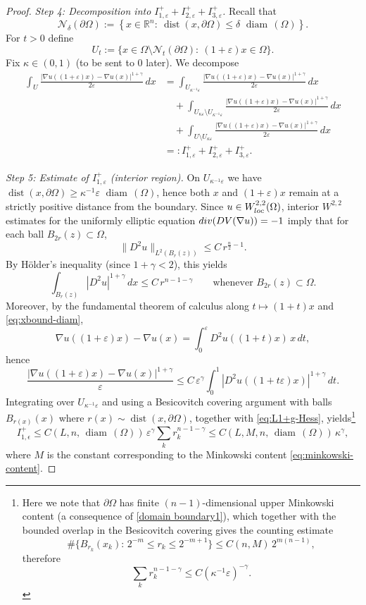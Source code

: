 \documentclass[10pt,a4paper]{amsart}
\def\diam{{\mathop\mathrm{\,diam\,}}}
\def\dist{{\mathop\mathrm{dist}}}
\def\ez{\epsilon}
\begin{document}
\begin{proof}
\medskip
\noindent\textit{Step 4: Decomposition into $I_{1,\varepsilon}^++I_{2,\varepsilon}^++I_{3,\varepsilon}^+$.}
Recall that
\[
\mathcal N_{\delta}(\partial \Omega):=\left\{ x\in \mathbb R^n:\ \dist(x,\partial \Omega)\le \delta\,\diam(\Omega) \right\}.
\]
For $t>0$ define
\[
U_t:=\Big\{x\in \Omega\setminus \mathcal N_{t}(\partial\Omega):\ (1+\varepsilon)x\in\Omega\Big\}.
\]
Fix $\kappa\in(0,1)$ (to be sent to $0$ later). We decompose
\begin{align*}
\int_U \frac{|\nabla u((1+\varepsilon)x)-\nabla u(x)|^{1+\gamma}}{2\varepsilon}\,dx
&=\int_{U_{\kappa^{-1}\varepsilon}} \frac{|\nabla u((1+\varepsilon)x)-\nabla u(x)|^{1+\gamma}}{2\varepsilon}\,dx\\
&\quad +\int_{U_{\kappa\varepsilon}\setminus U_{\kappa^{-1}\varepsilon}} \frac{|\nabla u((1+\varepsilon)x)-\nabla u(x)|^{1+\gamma}}{2\varepsilon}\,dx\\
&\quad +\int_{U\setminus U_{\kappa\varepsilon}} \frac{|\nabla u((1+\varepsilon)x)-\nabla u(x)|^{1+\gamma}}{2\varepsilon}\,dx\\
&=: I_{1,\varepsilon}^+ + I_{2,\varepsilon}^+ + I_{3,\varepsilon}^+.
\end{align*}

\medskip
\noindent\textit{Step 5: Estimate of $I_{1,\varepsilon}^+$ (interior region).}
On $U_{\kappa^{-1}\varepsilon}$ we have $\dist(x,\partial\Omega)\ge \kappa^{-1}\varepsilon\,\diam(\Omega)$, hence both $x$ and $(1+\varepsilon)x$ {remain at a strictly positive distance from the boundary}.
Since $u\in W^{2,2}_{\rm loc}(\Omega)$, interior $W^{2,2}$ estimates for the uniformly elliptic equation
${\rm div}(DV(\nabla u))=-1$ imply that for each ball $B_{2r}(z)\subset\Omega$,
\[
\|D^2u\|_{L^2(B_r(z))}\le C\,r^{\frac n2-1}.
\]
By H\"older's inequality (since $1+\gamma<2$), this yields
\begin{equation}\label{eq:L1+g-Hess}
\int_{B_r(z)} |D^2u|^{1+\gamma}\,dx \le C\,r^{n-1-\gamma}\qquad\text{whenever }B_{2r}(z)\subset\Omega.
\end{equation}
Moreover, by the fundamental theorem of calculus along $t\mapsto (1+t)x$ and \eqref{eq:xbound-diam},
\[
\nabla u((1+\varepsilon)x)-\nabla u(x)=\int_0^\varepsilon D^2u((1+t)x)\,x\,dt,
\]
hence
\[
\frac{|\nabla u((1+\varepsilon)x)-\nabla u(x)|^{1+\gamma}}{\varepsilon}
\le C\,\varepsilon^\gamma\int_0^1 |D^2u((1+t\varepsilon)x)|^{1+\gamma}\,dt.
\]
Integrating over $U_{\kappa^{-1}\varepsilon}$ and using a Besicovitch covering argument with balls
$B_{r(x)}(x)$ where $r(x)\sim \dist(x,\partial\Omega)$, together with \eqref{eq:L1+g-Hess}, yields\footnote{Here we note that $\partial\Omega$ has finite $(n{-}1)$-dimensional upper Minkowski content (a consequence of
	\eqref{domain boundary1}), {which together with the bounded overlap in the Besicovitch covering gives the counting estimate}
	\[
	{\#\{B_{r_k}(x_k):\,2^{-m}\le r_k\le 2^{-m+1}\}\le C(n,M)\,2^{m(n-1)},}
	\] 
	{therefore}
	$$
	{\sum_k r_k^{n-1-\gamma} \leq C (\kappa^{-1}\varepsilon)^{-\gamma}.}
	$$
} 
\[
I_{1,\ez}^+ \le C(L,n,\diam(\Omega))\,\varepsilon^\gamma \sum_k r_k^{n-1-\gamma}
\le C(L,M,n,\diam(\Omega))\,\kappa^\gamma{,}
\]
{where $M$ is the constant corresponding to the Minkowski content \eqref{eq:minkowski-content}.} 


\end{proof}
\end{document}
